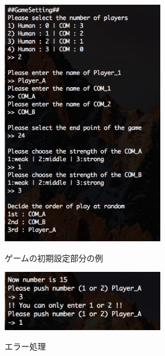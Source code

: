\documentclass[a4paper,10pt]{jsarticle}
\begin{document}
\begin{figure}[htbp]
  \begin{minipage}{0.5\hsize}
    \centering
    \includegraphics[width=70mm]{./image/GameSet.png}
    \caption{ゲームの初期設定部分の例}
    \label{fig:GameSet}
    \vspace{7em}
    \includegraphics[width=70mm]{./image/GameMiss.png}
    \caption{エラー処理}
    \label{fig:GameMiss}
  \end{minipage}
  \begin{minipage}{0.5\hsize}
    \centering

\end{minipage}
\end{figure}
\end{document}
